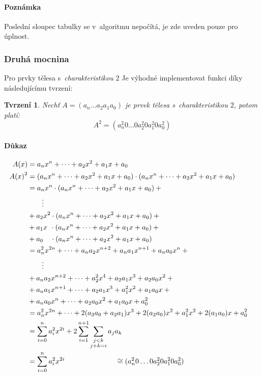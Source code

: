 \documentclass[thesis=M,czech,hidelinks]{FITthesis}[2012/06/26]
\newcommand{\0}{{\textcolor[gray]{0.80}{0}}}
\newtheorem{tvrzeni}{Tvrzení}
\begin{document}
\paragraph{Poznámka} Poslední sloupec tabulky se v~algoritmu nepočítá, je zde
uveden pouze pro úplnost.


\subsubsection{Druhá mocnina}
Pro prvky tělesa s~\emph{charakteristikou} $2$ Je výhodné implementovat funkci
 díky následujícímu tvrzení:


\begin{tvrzeni}
    Nechť $A=(a_n \dots a_2 a_1 a_0)$ je prvek tělesa
    s~\emph{charakteristikou} $2$, potom platí:
    $$ A^2 = (a_n^2 0 \dots 0 a_2^2 0 a_1^2 0 a_0^2) $$
\end{tvrzeni}

\paragraph{Důkaz}
\begin{align*}
    A(x)     &=  a_n x^n + \dots + a_2 x^2 + a_1 x + a_0 \\
    {A(x)}^2 &=  (a_n x^n + \dots + a_2 x^2 + a_1 x + a_0)\cdot(a_n x^n + \dots + a_2 x^2 + a_1 x + a_0) \\
             &= a_n x^n   \cdot (a_n x^n + \dots + a_2 x^2 + a_1 x + a_0) + {} \\
             & \qquad \vdots \\
             &  {} + a_2 x^2   \cdot (a_n x^n + \dots + a_2 x^2 + a_1 x + a_0) + {} \\
             &  {} + a_1 x \, \:  \cdot (a_n x^n + \dots + a_2 x^2 + a_1 x + a_0) + {} \\
             &  {} + a_0 \quad \cdot (a_n x^n + \dots + a_2 x^2 + a_1 x + a_0) \\
             &= a_n^2 x^{2n}    + \dots + a_n a_2 x^{n+2} + a_n a_1 x^{n+1} + a_n a_0 x^n + {} \\
             & \qquad \vdots \\
             &  {} + a_n a_2 x^{n+2} + \dots + a_2^2 x^4       + a_2 a_1 x^3     + a_2 a_0 x^2 + {} \\
             &  {} + a_n a_1 x^{n+1} + \dots + a_2 a_1 x^3     + a_1^2 x^2       + a_1 a_0 x   + {} \\
             &  {} + a_n a_0 x^n     + \dots + a_2 a_0 x^2     + a_1 a_0 x       + a_0^2            \\
             &= a_n^2 x^{2n} + \dots  + 2 ( a_3 a_0 + a_2 a_1 ) x^3  + 2 ( a_2 a_0 ) x^2 + a_1^2 x^2 + 2 ( a_1 a_0 ) x + a_0^2  \\
             &= \sum_{i=0}^{n} a_i^2 x^{2i} + 2 \sum_{i=1}^{n+1}\sum_{\substack{
    j<k \\ j+k = i }} a_j a_k &\\
             &= \sum_{i=0}^{n} a_i^2 x^{2i}
    \hspace{2.5cm} \cong (a_n^2 0 \dots 0 a_2^2 0 a_1^2 0 a_0^2)
\end{align*}
\end{document}
